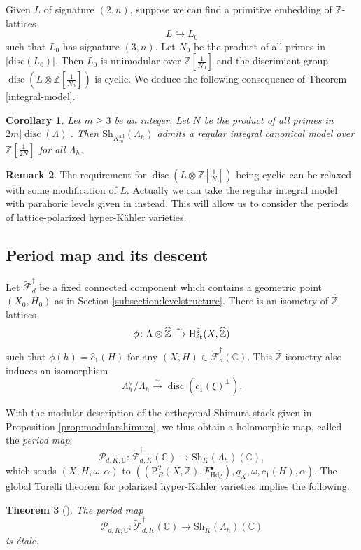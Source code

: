 \documentclass[11pt,reqno,oneside]{amsart}
\numberwithin{equation}{section}
\newtheorem{theorem}{Theorem}[section]
\newtheorem{corollary}[theorem]{Corollary}
\theoremstyle{definition}
\newtheorem{remark}[theorem]{Remark}
\DeclareMathOperator{\ad}{ad}
\DeclareMathOperator{\disc}{disc}
\DeclareMathOperator{\hdg}{Hdg}
\DeclareMathOperator{\et}{\Acute{e}t}
\newcommand{\Sh}{\mathrm{Sh}}
\newcommand{\scF}{\mathscr{F}}
\newcommand\rH{\mathrm{H}}
\newcommand\rP{\mathrm{P}}
\newcommand{\CC}{\mathbb{C}}
\newcommand{\ZZ}{\mathbb{Z}}
\begin{document}
Given $L$ of signature $(2,n)$, suppose we can find a primitive embedding of $\ZZ$-lattices
\[
L \hookrightarrow L_0
\]
such that $L_0$ has signature $(3,n)$.  Let $N_0$ be the product of all primes in $|\mathrm{disc}(L_0)|$. Then $L_0$ is unimodular over $\ZZ[\frac{1}{N_0}]$ and the discrimiant group $\disc \left(L\otimes \ZZ[\frac{1}{N_0}]\right)$ is cyclic.  We deduce the following consequence of Theorem \ref{integral-model}.
\begin{corollary}\label{corollary:integral-shi-hk}
Let $m \geq 3$ be an integer. Let $N$ be the product of all primes in  $2m|\disc(\Lambda)|$. Then $\Sh_{K^{\ad}_m}(\Lambda_h)$ admits a regular integral canonical model over $\ZZ[\frac{1}{2N}]$ for all $\Lambda_h$. 
\end{corollary}


\begin{remark}
The requirement for $\disc(L \otimes \ZZ[\frac{1}{N}])$ being cyclic can be relaxed with some modification of $L$. Actually we can take the regular integral model with parahoric levels given in \cite{KisinPappas,PappasZachos} instead. This will allow us to consider the periods of lattice-polarized hyper-Kähler varieties.
\end{remark}


\subsection{Period map and its descent}

Let $\widetilde{\scF}_{d}^{\dag}$ be a fixed connected component which contains a geometric point $(X_0, H_0)$ as in Section \ref{subsection:levelstructure}. There is an isometry of $\widehat{\ZZ}$-lattices
\[ 
 \phi \colon \Lambda \otimes \widehat{\ZZ} \xrightarrow{\sim}\rH^2_{\et}(X, \widehat{\ZZ})
\]
such that $\phi(h)= \widehat{c}_1(H)$ for any $(X,H) \in \widetilde{\scF}_d^\dag(\CC)$. This $\widehat{\ZZ}$-isometry also induces an isomorphism
\[
\Lambda_h^{\vee}/\Lambda_h \xrightarrow{\sim} \disc(c_1(\xi)^{\bot}).
\]


With the modular description of the orthogonal Shimura stack given in Proposition \ref{prop:modularshimura}, we thus obtain a holomorphic map, called the   \textit{period map}:
\[
\mathcal{P}_{d,K,\CC} \colon \widetilde{\scF}_{d,K}^{\dag}(\CC)\rightarrow \Sh_{K}(\Lambda_h)(\CC), 
\]
which sends $(X,H,\omega,\alpha)$ to $\left((\rP^2_B(X,\ZZ), F^\bullet_{\hdg}),q_X,\omega, c_1(H),\alpha\right)$. 
The global Torelli theorem for polarized hyper-Kähler varieties implies the following. 
\begin{theorem}[{\cite[Theorem 8.4]{Ve13}}]
	The period map 
	\begin{equation}\label{torelli}
	\mathcal{P}_{d,K,\CC}\colon \widetilde{\scF}_{d,K}^{\dag}(\CC)\rightarrow \Sh_{K}(\Lambda_h)(\CC)
	\end{equation}  
	is \'etale.
\end{theorem}
\end{document}
